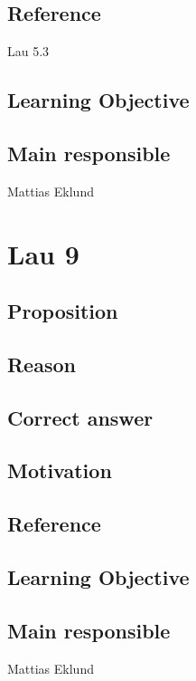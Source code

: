 \documentclass[a4paper]{article}
\begin{document}
	\subsection{Reference}
		Lau 5.3
	\subsection{Learning Objective}
	\subsection{Main responsible}
		Mattias Eklund

\section{Lau 9}
	\subsection{Proposition}

	\subsection{Reason}

	\subsection{Correct answer}

	\subsection{Motivation}

	\subsection{Reference}

	\subsection{Learning Objective}

	\subsection{Main responsible}
		Mattias Eklund
\end{document}
